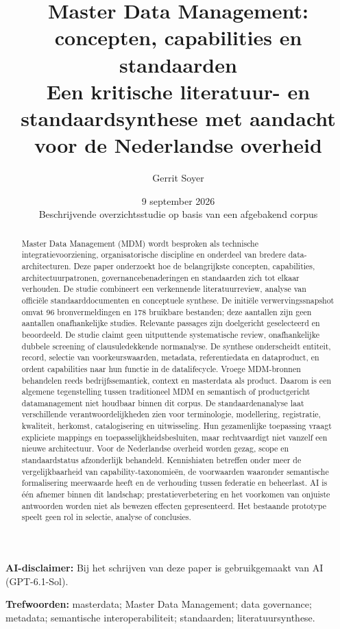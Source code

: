 \documentclass[11pt,a4paper]{article}
\title{Master Data Management: concepten, capabilities en standaarden\\\large Een kritische literatuur- en standaardsynthese met aandacht voor de Nederlandse overheid}
\author{Gerrit Soyer}
\date{9 september 2026\\\small Beschrijvende overzichtsstudie op basis van een afgebakend corpus}
\begin{document}
\maketitle
\noindent\textbf{AI-disclaimer:} Bij het schrijven van deze paper is gebruikgemaakt van AI (GPT-6.1-Sol).
\par\medskip
\begin{abstract}
Master Data Management (MDM) wordt besproken als technische integratievoorziening, organisatorische discipline en onderdeel van bredere data-architecturen. Deze paper onderzoekt hoe de belangrijkste concepten, capabilities, architectuurpatronen, governancebenaderingen en standaarden zich tot elkaar verhouden. De studie combineert een verkennende literatuurreview, analyse van officiële standaarddocumenten en conceptuele synthese. De initiële verwervingssnapshot omvat 96 bronvermeldingen en 178 bruikbare bestanden; deze aantallen zijn geen aantallen onafhankelijke studies. Relevante passages zijn doelgericht geselecteerd en beoordeeld. De studie claimt geen uitputtende systematische review, onafhankelijke dubbele screening of clausuledekkende normanalyse. De synthese onderscheidt entiteit, record, selectie van voorkeurswaarden, metadata, referentiedata en dataproduct, en ordent capabilities naar hun functie in de datalifecycle. Vroege MDM-bronnen behandelen reeds bedrijfssemantiek, context en masterdata als product. Daarom is een algemene tegenstelling tussen traditioneel MDM en semantisch of productgericht datamanagement niet houdbaar binnen dit corpus. De standaardenanalyse laat verschillende verantwoordelijkheden zien voor terminologie, modellering, registratie, kwaliteit, herkomst, catalogisering en uitwisseling. Hun gezamenlijke toepassing vraagt expliciete mappings en toepasselijkheidsbesluiten, maar rechtvaardigt niet vanzelf een nieuwe architectuur. Voor de Nederlandse overheid worden gezag, scope en standaardstatus afzonderlijk behandeld. Kennishiaten betreffen onder meer de vergelijkbaarheid van capability-taxonomieën, de voorwaarden waaronder semantische formalisering meerwaarde heeft en de verhouding tussen federatie en beheerlast. AI is één afnemer binnen dit landschap; prestatieverbetering en het voorkomen van onjuiste antwoorden worden niet als bewezen effecten gepresenteerd. Het bestaande prototype speelt geen rol in selectie, analyse of conclusies.
\end{abstract}
\noindent\textbf{Trefwoorden:} masterdata; Master Data Management; data governance; metadata; semantische interoperabiliteit; standaarden; literatuursynthese.
\newpage
\tableofcontents
\newpage





\appendix
\end{document}

